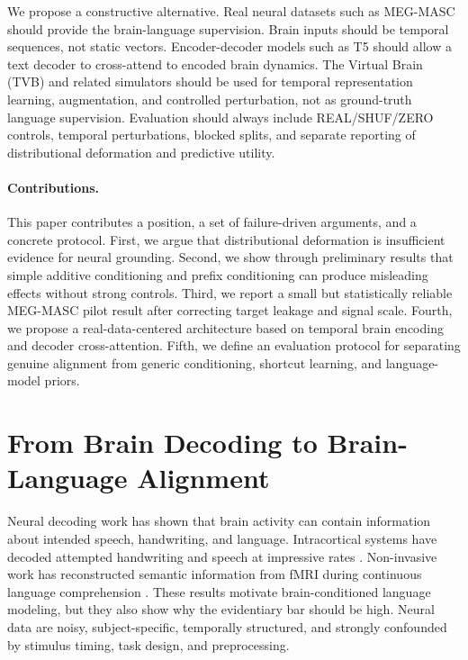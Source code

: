 \documentclass{article}
\begin{document}
We propose a constructive alternative.
Real neural datasets such as MEG-MASC \citep{gwilliams2023megmasc} should provide the brain-language supervision.
Brain inputs should be temporal sequences, not static vectors.
Encoder-decoder models such as T5 \citep{raffel2020t5} should allow a text decoder to cross-attend to encoded brain dynamics.
The Virtual Brain (TVB) \citep{schirner2022brain} and related simulators should be used for temporal representation learning, augmentation, and controlled perturbation, not as ground-truth language supervision.
Evaluation should always include REAL/SHUF/ZERO controls, temporal perturbations, blocked splits, and separate reporting of distributional deformation and predictive utility.

\paragraph{Contributions.}
This paper contributes a position, a set of failure-driven arguments, and a concrete protocol.
First, we argue that distributional deformation is insufficient evidence for neural grounding.
Second, we show through preliminary results that simple additive conditioning and prefix conditioning can produce misleading effects without strong controls.
Third, we report a small but statistically reliable MEG-MASC pilot result after correcting target leakage and signal scale.
Fourth, we propose a real-data-centered architecture based on temporal brain encoding and decoder cross-attention.
Fifth, we define an evaluation protocol for separating genuine alignment from generic conditioning, shortcut learning, and language-model priors.

\section{From Brain Decoding to Brain-Language Alignment}

Neural decoding work has shown that brain activity can contain information about intended speech, handwriting, and language.
Intracortical systems have decoded attempted handwriting and speech at impressive rates \citep{makin2020handwriting,willett2021handwriting,moses2021neuroprosthesis,willett2023speechavatar}.
Non-invasive work has reconstructed semantic information from fMRI during continuous language comprehension \citep{tang2023semanticreconstruction}.
These results motivate brain-conditioned language modeling, but they also show why the evidentiary bar should be high.
Neural data are noisy, subject-specific, temporally structured, and strongly confounded by stimulus timing, task design, and preprocessing.
\end{document}

